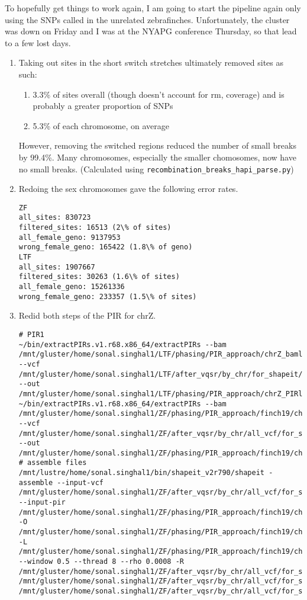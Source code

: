 \documentclass[idxtotoc,hyperref,openany,oneside]{labbook} %
\begin{document}
To hopefully get things to work again, I am going to start the pipeline again only using the SNPs called in the unrelated zebrafinches. Unfortunately, the cluster was down on Friday and I was at the NYAPG conference Thursday, so that lead to a few lost days.

\begin{enumerate}
\item Taking out sites in the short switch stretches ultimately removed sites as such:
\begin{enumerate}
		\item 3.3\% of sites overall (though doesn't account for rm, coverage) and is probably a greater proportion of SNPs
		\item 5.3\% of each chromosome, on average
\end{enumerate}
However, removing the switched regions reduced the number of small breaks by 99.4\%. Many chromosomes, especially the smaller chomosomes, now have no small breaks. (Calculated using \verb+recombination_breaks_hapi_parse.py+)
\item Redoing the sex chromosomes gave the following error rates.
\begin{verbatim}
ZF
all_sites: 830723
filtered_sites: 16513 (2\% of sites)
all_female_geno: 9137953
wrong_female_geno: 165422 (1.8\% of geno)
LTF
all_sites: 1907667
filtered_sites: 30263 (1.6\% of sites)
all_female_geno: 15261336
wrong_female_geno: 233357 (1.5\% of sites)
\end{verbatim}
\item Redid both steps of the PIR for chrZ.
\begin{verbatim}
# PIR1
~/bin/extractPIRs.v1.r68.x86_64/extractPIRs --bam /mnt/gluster/home/sonal.singhal1/LTF/phasing/PIR_approach/chrZ_bamlist --vcf /mnt/gluster/home/sonal.singhal1/LTF/after_vqsr/by_chr/for_shapeit/gatk.ug.ltf.chrZ.allfilters.recodedsex.recoded_biallelicSNPs.males.vcf.gz --out /mnt/gluster/home/sonal.singhal1/LTF/phasing/PIR_approach/chrZ_PIRlist
~/bin/extractPIRs.v1.r68.x86_64/extractPIRs --bam /mnt/gluster/home/sonal.singhal1/ZF/phasing/PIR_approach/finch19/chrZ_bamlist --vcf /mnt/gluster/home/sonal.singhal1/ZF/after_vqsr/by_chr/all_vcf/for_shapeit/gatk.ug.finch19.chrZ.allfilters.recodedsex.recoded_biallelicSNPs.males.vcf.gz --out /mnt/gluster/home/sonal.singhal1/ZF/phasing/PIR_approach/finch19/chrZ_PIRlist
# assemble files 
/mnt/lustre/home/sonal.singhal1/bin/shapeit_v2r790/shapeit -assemble --input-vcf /mnt/gluster/home/sonal.singhal1/ZF/after_vqsr/by_chr/all_vcf/for_shapeit/gatk.ug.finch19.chrZ.allfilters.recodedsex.recoded_biallelicSNPs.males.vcf.gz --input-pir /mnt/gluster/home/sonal.singhal1/ZF/phasing/PIR_approach/finch19/chrZ_PIRlist -O /mnt/gluster/home/sonal.singhal1/ZF/phasing/PIR_approach/finch19/chrZ_haplotypes -L /mnt/gluster/home/sonal.singhal1/ZF/phasing/PIR_approach/finch19/chrZ_haplotypes --window 0.5 --thread 8 --rho 0.0008 -R /mnt/gluster/home/sonal.singhal1/ZF/after_vqsr/by_chr/all_vcf/for_shapeit/chrZ.hap.gz /mnt/gluster/home/sonal.singhal1/ZF/after_vqsr/by_chr/all_vcf/for_shapeit/chrZ.legend.gz /mnt/gluster/home/sonal.singhal1/ZF/after_vqsr/by_chr/all_vcf/for_shapeit/chrZ.sample

\end{verbatim}
\end{enumerate}
\end{document}
